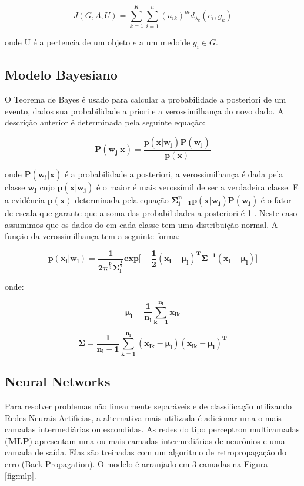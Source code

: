 \documentclass[12pt]{article}
\begin{document}
$$ J(G,\Lambda,U) = \sum_{k=1}^{K}\sum_{i=1}^{n} (u_{ik})^m d_{\lambda_{k}}(e_i,g_k) $$

onde U é a pertencia de um objeto $e$ a um medoide $ g_i \in G $.    

\subsection{Modelo Bayesiano}

O Teorema de Bayes é usado para calcular a probabilidade a posteriori de um evento, dados sua probabilidade a priori e a verossimilhança do novo dado. A descrição anterior é determinada pela seguinte equação:

\begin{equation}
\mathbf{P(w_j\vert x)= \dfrac{p(x\vert w_j) P(w_j)}{p(x)} }
\end{equation}

onde $\mathbf{P(w_j\vert x)}$ é a probabilidade a posteriori, a verossimilhança  é dada pela classe $\mathbf{w_j}$ cujo $\mathbf{p(x\vert w_j)}$ é o maior é mais verossímil de ser a verdadeira classe. E a evidência $\mathbf{p(x)}$ determinada pela equação $\mathbf{\Sigma_{j=1}^{n} p(x\vert w_j) P(w_j)}$ é o fator de escala que garante que a soma das probabilidades a posteriori é 1 \cite{duda2012pattern}. Neste caso assumimos que os dados do em cada classe tem uma distribuição normal. A função da verossimilhança tem a seguinte forma: 

\begin{equation}
\mathbf{p(x_i\vert w_l)= \dfrac{1}{2\pi^\frac{p}{2}\Sigma_{l}^{\frac{1}{2}}}exp\Bigg[ -\frac{1}{2}(x_i- \mu_{l})^{T}\Sigma^{-1}(x_i-\mu_{l}) \Bigg ]  }
\end{equation}

onde:

\begin{equation}
\mathbf{\mu_{l} = \dfrac{1}{n_l} \sum_{k=1}^{n_l} x_{lk} }
\end{equation}

\begin{equation}
\mathbf{\Sigma = \dfrac{1}{n_l-1} \sum_{k=1}^{n_l} (x_{lk}-\mu_l) (x_{lk}-\mu_l)^T }
\end{equation}

\subsection{Neural Networks}

Para resolver problemas não linearmente separáveis e de classificação utilizando Redes Neurais Artificias, a alternativa mais utilizada é adicionar uma o mais camadas intermediárias ou escondidas. As redes do tipo perceptron multicamadas $\textbf{(MLP)}$ apresentam uma ou mais camadas intermediárias de neurônios e uma camada de saída. Elas são treinadas com um algoritmo de retropropagação do erro (Back Propagation).
O modelo é arranjado em 3 camadas na Figura \ref{fig:mlp}.
\end{document}
